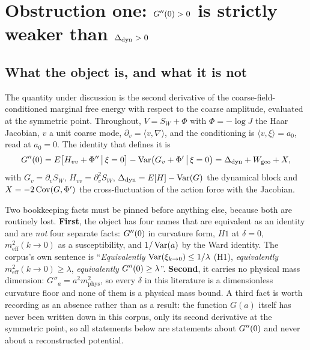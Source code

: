 \section[Obstruction one: the curvature floor is strictly weaker than the dynamical block]{Obstruction one: $G''(0)>0$ is strictly weaker than $\Delta_{\mathrm{dyn}}>0$}\label{sec:obs1}

\subsection{What the object is, and what it is not}

The quantity under discussion is the second derivative of the coarse-field-conditioned marginal
free energy with respect to the coarse amplitude, evaluated at the symmetric point. Throughout,
$V=S_W+\Phi$ with $\Phi=-\log J$ the Haar Jacobian, $v$ a unit coarse mode,
$\partial_v=\langle v,\nabla\rangle$, and the conditioning is $\langle v,\xi\rangle=a_0$, read at
$a_0=0$. The identity that defines it is
\begin{equation}
G''(0)=E\bigl[H_{vv}+\Phi''\,\big|\,\xi=0\bigr]-\operatorname{Var}\bigl(G_v+\Phi'\,\big|\,\xi=0\bigr)
=\Delta_{\mathrm{dyn}}+W_{\mathrm{geo}}+X,
\label{eq:split5}
\end{equation}
with $G_v=\partial_vS_W$, $H_{vv}=\partial_v^2S_W$,
$\Delta_{\mathrm{dyn}}=E[H]-\operatorname{Var}(G)$ the dynamical block and $X=-2\operatorname{Cov}(G,\Phi')$ the cross-fluctuation of the
action force with the Jacobian. \LT{}


Two bookkeeping facts must be pinned before anything else, because both are routinely lost.
\textbf{First}, the object has four names that are equivalent as an identity and are \emph{not}
four separate facts: $G''(0)$ in curvature form, $H1$ at $\delta=0$, $m^2_{\mathrm{eff}}(k\to0)$ as
a susceptibility, and $1/\operatorname{Var}(a)$ by the Ward identity. The corpus's own sentence is
``\emph{Equivalently} $\operatorname{Var}(\xi_{k\to0})\le1/\lambda$ (H1), \emph{equivalently}
$m^2_{\mathrm{eff}}(k\to0)\ge\lambda$, \emph{equivalently} $G''(0)\ge\lambda$''. \LT{}
\textbf{Second}, it carries no physical mass dimension: $G''_a=a^2m^2_{\mathrm{phys}}$, so every
$\delta$ in this literature is a dimensionless curvature floor and none of them is a physical mass
bound. \LT{} A third fact is worth recording as an absence rather than as a result: the function
$G(a)$ itself has never been written down in this corpus, only its second derivative at the
symmetric point, so all statements below are statements about $G''(0)$ and never about a
reconstructed potential.

